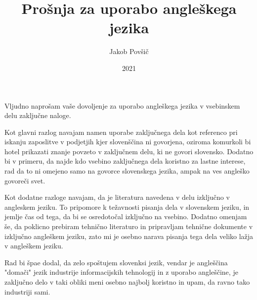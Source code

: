 \documentclass[12p]{article}
\title{Prošnja za uporabo angleškega jezika}
\author{Jakob Povšič}
\date{2021}
\begin{document}
\maketitle
Vljudno naprošam vaše dovoljenje za uporabo angleškega jezika v vsebinskem delu zaključne naloge.

Kot glavni razlog navajam namen uporabe zaključnega dela kot referenco pri iskanju zaposlitve v podjetjih kjer slovenščina ni govorjena, oziroma komurkoli bi hotel prikazati znanje povzeto v zaključnem delu, ki ne govori slovensko.
Dodatno bi v primeru, da najde kdo vsebino zaključnega dela koristno za lastne interese, rad da to ni omejeno samo na govorce slovenskega jezika, ampak na ves angleško govoreči svet.

Kot dodatne razloge navajam, da je literatura navedena v delu izključno v angleskem jeziku.
To pripomore k težavnosti pisanja dela v slovenskem jeziku, in jemlje čas od tega, da bi se osredotočal izključno na vsebino.
Dodatno omenjam še, da poklicno prebiram tehnično literaturo in pripravljam tehnične dokumente v izključno angleškem jeziku, zato mi je osebno narava pisanja tega dela veliko lažja v angleškem jeziku.

Rad bi špae dodal, da zelo spoštujem slovenksi jezik, vendar je angleščina "domači" jezik industrije informacijskih tehnologij in z uporabo angleščine, je zaključno delo v taki obliki meni osebno najbolj koristno in upam, da ravno tako industriji sami.
\end{document}

